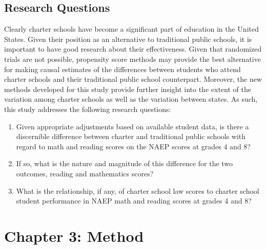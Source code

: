 \documentclass[letterpaper,12pt]{article} %
\begin{document}
\subsection{Research Questions}

Clearly charter schools have become a significant part of education in the United States. Given their position as an alternative to traditional public schools, it is important to have good research about their effectiveness. Given that randomized trials are not possible, propensity score methods may provide the best alternative for making causal estimates of the differences between students who attend charter schools and their traditional public school counterpart. Moreover, the new methods developed for this study provide further insight into the extent of the variation among charter schools as well as the variation between states. As such, this study addresses the following research questions:

\begin{enumerate}
\item Given appropriate adjustments based on available student data, is there a discernible difference between charter and traditional public schools with regard to math and reading scores on the NAEP scores at grades 4 and 8? 
\item If so, what is the nature and magnitude of this difference for the two outcomes, reading and mathematics scores?  
\item What is the relationship, if any, of charter school law scores to charter school student performance in NAEP math and reading scores at grades 4 and 8?  
\end{enumerate}

\cleardoublepage
\section{Chapter 3: Method}
\end{document}
